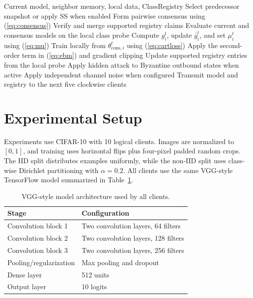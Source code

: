 \documentclass[conference]{IEEEtran}
\begin{document}
\begin{algorithm}[t]
\caption{CART update at client $i$}
\label{alg:cart}
\footnotesize
\begin{algorithmic}[1]
\REQUIRE Current model, neighbor memory, local data, ClassRegistry
\STATE Select predecessor snapshot or apply SS when enabled
\STATE Form pairwise consensus using (\ref{eq:consensus})
\STATE Verify and merge supported registry claims
\STATE Evaluate current and consensus models on the local class probe
\STATE Compute $g_i^t$, update $\bar g_i^t$, and set $\mu_i^t$ using (\ref{eq:mu})
\STATE Train locally from $\theta_{\mathrm{cons},i}^t$ using (\ref{eq:cartloss})
\STATE Apply the second-order term in (\ref{eq:ebm}) and gradient clipping
\ENDIF
\STATE Update supported registry entries from the local probe
\STATE Apply hidden attack to Byzantine outbound states when active
\STATE Apply independent channel noise when configured
\STATE Transmit model and registry to the next five clockwise clients
\end{algorithmic}
\end{algorithm}

\section{Experimental Setup}
Experiments use CIFAR-10 with 10 logical clients. Images are normalized to $[0,1]$, and training uses horizontal flips plus four-pixel padded random crops. The IID split distributes examples uniformly, while the non-IID split uses class-wise Dirichlet partitioning with $\alpha=0.2$. All clients use the same VGG-style TensorFlow model summarized in Table~\ref{tab:model_architecture}.

\begin{table}[t]
\caption{VGG-style model architecture used by all clients.}
\label{tab:model_architecture}
\centering
\footnotesize
\setlength{\tabcolsep}{3.4pt}
\begin{tabular}{@{}ll@{}}
\toprule
\textbf{Stage} & \textbf{Configuration} \\
\midrule
Convolution block 1 & Two convolution layers, 64 filters \\
Convolution block 2 & Two convolution layers, 128 filters \\
Convolution block 3 & Two convolution layers, 256 filters \\
Pooling/regularization & Max pooling and dropout \\
Dense layer & 512 units \\
Output layer & 10 logits \\
\bottomrule
\end{tabular}
\end{table}
\end{document}
